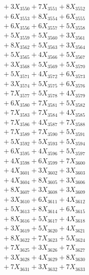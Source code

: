 \documentclass[a4paper,10pt]{article}
\begin{document}
{\begin{align}
&\;  + 3 X_{3550} + 7 X_{3551} + 8 X_{3552} \\[0.3ex]
&\;  + 6 X_{3553} + 8 X_{3554} + 6 X_{3555} \\[0.3ex]
&\;  + 6 X_{3556} + 6 X_{3557} + 5 X_{3558} \\[0.3ex]
&\;  + 5 X_{3559} + 5 X_{3560} + 3 X_{3561} \\[0.3ex]
&\;  + 8 X_{3562} + 5 X_{3563} + 3 X_{3564} \\[0.3ex]
&\;  + 5 X_{3565} + 4 X_{3566} + 5 X_{3567} \\[0.3ex]
&\;  + 3 X_{3568} + 5 X_{3569} + 5 X_{3570} \\[0.3ex]
&\;  + 5 X_{3571} + 4 X_{3572} + 6 X_{3573} \\[0.3ex]
&\;  + 3 X_{3574} + 5 X_{3575} + 6 X_{3576} \\[0.3ex]
&\;  + 7 X_{3577} + 5 X_{3578} + 4 X_{3579} \\[0.5ex]\allowbreak
&\;  + 6 X_{3580} + 7 X_{3581} + 5 X_{3582} \\[0.3ex]
&\;  + 7 X_{3583} + 7 X_{3584} + 4 X_{3585} \\[0.3ex]
&\;  + 7 X_{3586} + 4 X_{3587} + 7 X_{3588} \\[0.3ex]
&\;  + 7 X_{3589} + 7 X_{3590} + 5 X_{3591} \\[0.3ex]
&\;  + 5 X_{3592} + 5 X_{3593} + 5 X_{3594} \\[0.3ex]
&\;  + 6 X_{3595} + 4 X_{3596} + 5 X_{3597} \\[0.3ex]
&\;  + 4 X_{3598} + 6 X_{3599} + 7 X_{3600} \\[0.3ex]
&\;  + 4 X_{3601} + 3 X_{3602} + 3 X_{3603} \\[0.3ex]
&\;  + 4 X_{3604} + 8 X_{3605} + 3 X_{3606} \\[0.3ex]
&\;  + 8 X_{3607} + 3 X_{3608} + 3 X_{3609} \\[0.5ex]\allowbreak
&\;  + 3 X_{3610} + 6 X_{3611} + 4 X_{3612} \\[0.3ex]
&\;  + 5 X_{3613} + 8 X_{3614} + 6 X_{3615} \\[0.3ex]
&\;  + 8 X_{3616} + 5 X_{3617} + 4 X_{3618} \\[0.3ex]
&\;  + 3 X_{3619} + 5 X_{3620} + 4 X_{3621} \\[0.3ex]
&\;  + 8 X_{3622} + 7 X_{3623} + 5 X_{3624} \\[0.3ex]
&\;  + 7 X_{3625} + 3 X_{3626} + 7 X_{3627} \\[0.3ex]
&\;  + 3 X_{3628} + 4 X_{3629} + 8 X_{3630} \\[0.3ex]
&\;  + 7 X_{3631} + 3 X_{3632} + 7 X_{3633} \\[0.3ex]

\end{align}}
\end{document}
